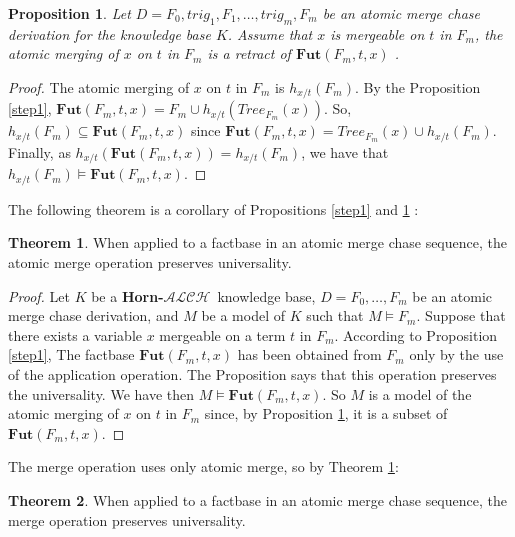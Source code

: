 \documentclass{article}
\newtheorem{proposition}{Proposition}[section]
\theoremstyle{definition}
\newtheorem{theorem}{Theorem}[section]
\theoremstyle{remark}
\newcommand{\Tree}{\textit{Tree}}
\newcommand{\Fut}{\textbf{Fut}}
\newcommand{\ALCH}{\textbf{Horn-$\mathcal{ALCH}$}}
\begin{document}
\begin{proposition} \label{step2}
Let $D = F_0,trig_1,F_1,\ldots, trig_m,F_m$ be an atomic merge chase derivation for the knowledge base $K$. Assume that $x$ is mergeable on $t$ in $F_m$, the atomic merging of $x$ on $t$ in $F_m$ is a retract of $\Fut(F_m,t,x)$ .
\end{proposition}

\begin{proof}
The atomic merging of $x$ on $t$ in $F_m$ is $h_{x/t}(F_m)$. By the Proposition \ref{step1}, $\Fut(F_m,t,x)= F_m \cup h_{x/t}(\Tree_{F_m}(x))$. So, $h_{x/t}(F_m) \subseteq \Fut(F_m,t,x) $ since $\Fut(F_m,t,x) = \Tree_{F_m}(x) \cup h_{x/t}(F_m)$. Finally, as $h_{x/t}(\Fut(F_m,t,x)) = h_{x/t}(F_m)$, we have that $h_{x/t}(F_m) \models \Fut(F_m,t,x)$.
\end{proof}

The following theorem is a corollary of Propositions \ref{step1} and \ref{step2} :

\begin{theorem} \label{universality atomic merge}
When applied to a factbase in an atomic merge chase sequence, the atomic merge operation preserves universality.
\end{theorem}

\begin{proof}
Let $K$ be a \ALCH\ knowledge base, $D=F_0,\ldots, F_m$ be an atomic merge chase derivation, and $M$ be a model of $K$ such that $M \models F_m$. Suppose that there exists a variable $x$ mergeable on a term $t$ in $F_m$. According to Proposition \ref{step1}, The factbase $\Fut(F_m,t,x)$ has been obtained from $F_m$ only by the use of the application operation. The Proposition  says that this operation preserves the universality. We have then $M \models \Fut(F_m,t,x)$. So $M$ is a model of the atomic merging of $x$ on $t$ in $F_m$ since, by Proposition \ref{step2}, it is a subset of $\Fut(F_m,t,x)$.
\end{proof}





The merge operation uses only atomic merge, so by Theorem \ref{universality atomic merge}:

\begin{theorem} \label{universality merge}
When applied to a factbase in an atomic merge chase sequence, the merge operation preserves universality.
\end{theorem}
\end{document}
